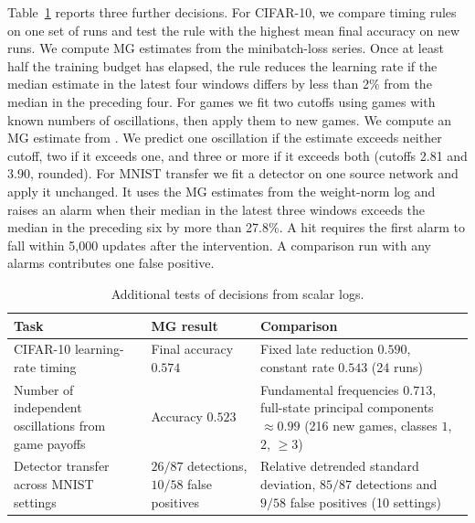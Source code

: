 {Table~\ref{tab:campaign_scope} reports three further decisions. For CIFAR-10, we compare timing rules on one set of runs and test the rule with the highest mean final accuracy on new runs. We compute MG estimates from the minibatch-loss series. Once at least half the training budget has elapsed, the rule reduces the learning rate if the median estimate in the latest four windows differs by less than 2\% from the median in the preceding four. For games we fit two cutoffs using games with known numbers of oscillations, then apply them to new games. We compute an MG estimate from . We predict one oscillation if the estimate exceeds neither cutoff, two if it exceeds one, and three or more if it exceeds both (cutoffs 2.81 and 3.90, rounded). For MNIST transfer we fit a detector on one source network and apply it unchanged. It uses the MG estimates from the weight-norm log and raises an alarm when their median in the latest three windows exceeds the median in the preceding six by more than 27.8\%. A hit requires the first alarm to fall within 5,000 updates after the intervention. A comparison run with any alarms contributes one false positive.

\begin{table}[!htbp]
\centering\small
\setlength{\abovecaptionskip}{4pt}
\caption{Additional tests of decisions from scalar logs.}
\label{tab:campaign_scope}
\begin{tabularx}{\linewidth}{@{}>{\raggedright\arraybackslash}p{.30\linewidth}>{\raggedright\arraybackslash}p{.21\linewidth}>{\raggedright\arraybackslash}X@{}}
\toprule
Task & MG result & Comparison \\
\midrule
CIFAR-10 learning-rate timing & Final accuracy $0.574$ & Fixed late reduction $0.590$, constant rate $0.543$ (24 runs) \\
Number of independent oscillations from game payoffs & Accuracy $0.523$ & Fundamental frequencies $0.713$, full-state principal components $\approx0.99$ (216 new games, classes $1$, $2$, $\ge3$) \\
Detector transfer across MNIST settings & $26/87$ detections, $10/58$ false positives & Relative detrended standard deviation, $85/87$ detections and $9/58$ false positives (10 settings) \\
\bottomrule
\end{tabularx}
\end{table}
}

